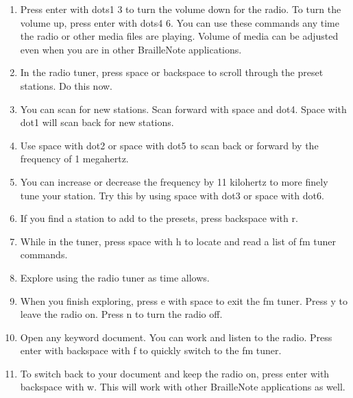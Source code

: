 \documentclass[10pt,letterpaper,twoside]{report}
\begin{document}
{{{{\begin{enumerate}
\begin{enumerate}
		      \item Press enter with dots1 3 to turn the volume down for the radio. To turn the volume up, press enter with dots4 6. You can use these commands any time the radio or other media files are playing. Volume of media can be adjusted even when you are in other BrailleNote applications.
		            
		      \item In the radio tuner, press space or backspace to scroll through the preset stations. Do this now.
		            
		      \item You can scan for new stations. Scan forward with space and dot4. Space with dot1 will scan back for new stations.
		            
		      \item Use space with dot2 or space with dot5 to scan back or forward by the frequency of 1 megahertz.
		            
		      \item You can increase or decrease the frequency by 11 kilohertz to more finely tune your station. Try this by using space with dot3 or space with dot6.
		            
		      \item If you find a station to add to the presets, press backspace with r.
		            
		      \item While in the tuner, press space with h to locate and read a list of fm tuner commands.
		            
		      \item Explore using the radio tuner as time allows.
		            
		      \item When you finish exploring, press e with space to exit the fm tuner. Press y to leave the radio on. Press n to turn the radio off.
		            
		      \item Open any keyword document. You can work and listen to the radio. Press enter with backspace with f to quickly switch to the fm tuner.
		            
		      \item To switch back to your document and keep the radio on, press enter with backspace with w. This will work with other BrailleNote applications as well.
	      \end{enumerate}
	      

\end{enumerate}}}}}
\end{document}
